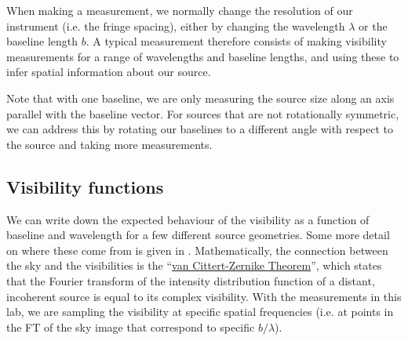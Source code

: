 \documentclass[11pt]{article}
\begin{document}


When making a measurement, we normally change the resolution of our instrument (i.e. the fringe spacing), either by changing the wavelength $\lambda$ or the baseline length $b$. A typical measurement therefore consists of making visibility measurements for a range of wavelengths and baseline lengths, and using these to infer spatial information about our source.

Note that with one baseline, we are only measuring the source size along an axis parallel with the baseline vector. For sources that are not rotationally symmetric, we can address this by rotating our baselines to a different angle with respect to the source and taking more measurements.

\subsection{Visibility functions}

We can write down the expected behaviour of the visibility as a function of baseline and wavelength for a few different source geometries. Some more detail on where these come from is given in \citet[][e.g. Fig 2.13]{2011psi..book.....G}. Mathematically, the connection between the sky and the visibilities is the ``\href{https://en.wikipedia.org/wiki/Van_Cittert%E2%80%93Zernike_theorem}{van Cittert-Zernike Theorem}'', which states that the Fourier transform of the intensity distribution function of a distant, incoherent source is equal to its complex visibility. With the measurements in this lab, we are sampling the visibility at specific spatial frequencies (i.e. at points in the FT of the sky image that correspond to specific $b/\lambda$).
\end{document}
